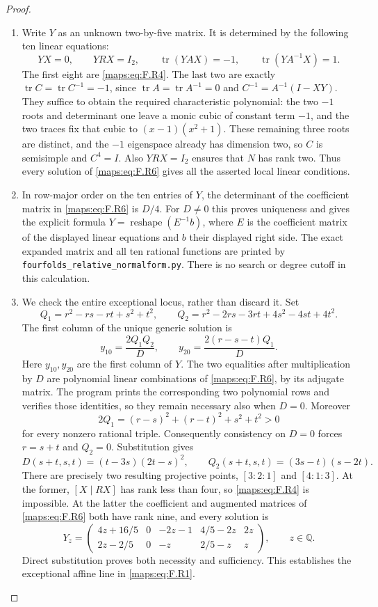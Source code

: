 \documentclass[11pt,a4paper]{article}
\theoremstyle{definition}
\begin{document}
\begin{proof}
\begin{enumerate}[label=\arabic*.]
\item Write $Y$ as an unknown two-by-five matrix.  It is determined
by the following ten linear equations:
\[
 YX=0,\qquad YRX=I_2,\qquad
 \operatorname{tr}(YAX)=-1,\qquad
 \operatorname{tr}(YA^{-1}X)=1.
 \tag{F.R6}\label{maps:eq:F.R6}
\]
The first eight are \eqref{maps:eq:F.R4}.  The last two are exactly
$\operatorname{tr}C=\operatorname{tr}C^{-1}=-1$, since
$\operatorname{tr}A=\operatorname{tr}A^{-1}=0$ and
$C^{-1}=A^{-1}(I-XY)$.
They suffice to obtain the required characteristic
polynomial: the two $-1$ roots and determinant one leave a
monic cubic of constant term $-1$, and the two traces fix
that cubic to $(x-1)(x^2+1)$.
These remaining three roots are distinct, and the $-1$
eigenspace already has dimension two, so $C$ is semisimple
and $C^4=I$.  Also $YRX=I_2$ ensures that $N$ has rank two.
Thus every solution of \eqref{maps:eq:F.R6} gives all the asserted local
linear conditions.

\item In row-major order on the ten entries of $Y$, the determinant
of the coefficient matrix in \eqref{maps:eq:F.R6} is $D/4$.
For $D\ne0$ this proves uniqueness and gives the explicit
formula $Y=\operatorname{reshape}(E^{-1}b)$, where $E$ is
the coefficient matrix of the displayed linear equations
and $b$ their displayed right side.
The exact expanded matrix and all ten rational functions
are printed by \texttt{fourfolds\_relative\_normalform.py}.
There is no search or degree cutoff in this calculation.

\item We check the entire exceptional locus, rather than discard it.
Set
\[
 Q_1=r^2-rs-rt+s^2+t^2,
 \qquad Q_2=r^2-2rs-3rt+4s^2-4st+4t^2.
\]
The first column of the unique generic solution is
\[
 y_{10}=\frac{2Q_1Q_2}{D},\qquad
 y_{20}=\frac{2(r-s-t)Q_1}{D}.
 \tag{F.R7}\label{maps:eq:F.R7}
\]
Here $y_{10},y_{20}$ are the first column of $Y$.
The two equalities after multiplication by $D$ are polynomial
linear combinations of \eqref{maps:eq:F.R6}, by its adjugate matrix.
The program prints the corresponding two polynomial rows
and verifies those identities, so they remain necessary
also when $D=0$.
Moreover
\[
 2Q_1=(r-s)^2+(r-t)^2+s^2+t^2>0
\]
for every nonzero rational triple.  Consequently consistency
on $D=0$ forces $r=s+t$ and $Q_2=0$.
Substitution gives
\[
 D(s+t,s,t)=(t-3s)(2t-s)^2,
 \qquad Q_2(s+t,s,t)=(3s-t)(s-2t).
 \tag{F.R8}\label{maps:eq:F.R8}
\]
There are precisely two resulting projective points,
$[3:2:1]$ and $[4:1:3]$.
At the former, $[X\mid RX]$ has rank less than four, so
\eqref{maps:eq:F.R4} is impossible.  At the latter the coefficient and
augmented matrices of \eqref{maps:eq:F.R6} both have rank nine, and every
solution is
\[
 Y_z=\begin{pmatrix}
 4z+16/5&0&-2z-1&4/5-2z&2z\\
 2z-2/5&0&-z&2/5-z&z
 \end{pmatrix},\qquad z\in\mathbb Q.
 \tag{F.R9}\label{maps:eq:F.R9}
\]
Direct substitution proves both necessity and sufficiency.
This establishes the exceptional affine line in \eqref{maps:eq:F.R1}.


\end{enumerate}
\end{proof}
\end{document}
